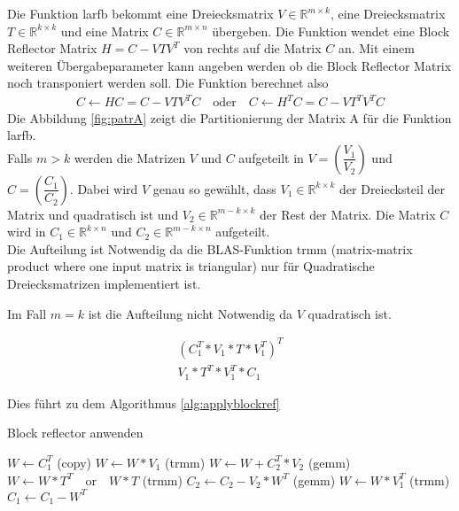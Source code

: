 Die Funktion larfb bekommt eine Dreiecksmatrix $V \in \mathbb{R}^{m \times k}$, eine Dreiecksmatrix $T \in \mathbb{R}^{k \times k}$ und eine Matrix $C \in \mathbb{R}^{m \times n }$ übergeben.
Die Funktion wendet eine  Block Reflector Matrix $ 	H = C - V T V^T $ von rechts auf die Matrix $ C $ an. 
Mit einem weiteren Übergabeparameter kann angeben werden ob die Block Reflector Matrix noch transponiert werden soll.
Die Funktion berechnet also
\begin{align*}
	C \leftarrow H C = C - V T V^T C \quad \text{oder} \quad 	C \leftarrow H^T C = C - V T^T V^T C
\end{align*}
Die Abbildung \ref{fig:patrA} zeigt die Partitionierung der Matrix A für die Funktion larfb.\\
Falls $m > k $ werden die Matrizen $V$ und $C$ aufgeteilt in $V=\left(\dfrac{V_1}{V_2}\right)$ und $C=\left(\dfrac{C_1}{C_2}\right)$. Dabei wird $V$ genau so gewählt, dass $V_1 \in \mathbb{R}^{k\times k}$ der Dreiecksteil der Matrix und quadratisch ist und $V_2 \in \mathbb{R}^{m-k\times k}$ der Rest der Matrix. Die Matrix $C$ wird in $C_1 \in \mathbb{R}^{k \times n}$ und $C_2 \in \mathbb{R}^{m-k \times n}$  aufgeteilt.\\
Die Aufteilung ist Notwendig da die BLAS-Funktion trmm (matrix-matrix product where one input matrix is triangular) nur für Quadratische Dreiecksmatrizen implementiert ist.

Im Fall $ m = k $ ist die Aufteilung nicht Notwendig da $ V $ quadratisch ist.

\begin{align*}
	(C_1^T * V_1 * T *V_1^T)^T\\
	V_1 * T^T * V_1^T * C_1
\end{align*}



Dies führt zu dem Algorithmus \ref{alg:applyblockref}
\begin{algorithm}
	\caption{Block reflector anwenden}
	\label{alg:applyblockref}
	\begin{algorithmic}
		\State 	$W \leftarrow C_1^T$ (copy)
		\State	$W \leftarrow W * V_1 $ (trmm)
			\State $W \leftarrow W + C_2^T*V_2$ (gemm)
		\EndIf
		\State 	$ W \leftarrow W * T^T \quad \text{or}\quad  W * T$ (trmm)
			\State $C_2 \leftarrow C_2 - V_2 * W^T$ (gemm)
		\EndIf
		\State 	$ W \leftarrow W * V_1^T $ (trmm)
		\State 	$ C_1 \leftarrow C_1 - W^T $
	\end{algorithmic}
\end{algorithm}



